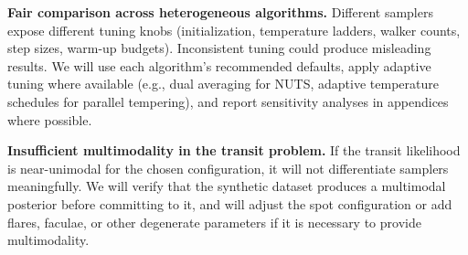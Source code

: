 \documentclass{article}
\begin{document}
\textbf{Fair comparison across heterogeneous algorithms.} Different samplers expose different tuning knobs (initialization, temperature ladders, walker counts, step sizes, warm-up budgets). Inconsistent tuning could produce misleading results. We will use each algorithm's recommended defaults, apply adaptive tuning where available (e.g., dual averaging for NUTS, adaptive temperature schedules for parallel tempering), and report sensitivity analyses in appendices where possible.

\textbf{Insufficient multimodality in the transit problem.} If the transit likelihood is near-unimodal for the chosen configuration, it will not differentiate samplers meaningfully. We will verify that the synthetic dataset produces a multimodal posterior before committing to it, and will adjust the spot configuration or add flares, faculae, or other degenerate parameters if it is necessary to provide multimodality.



\end{document}
